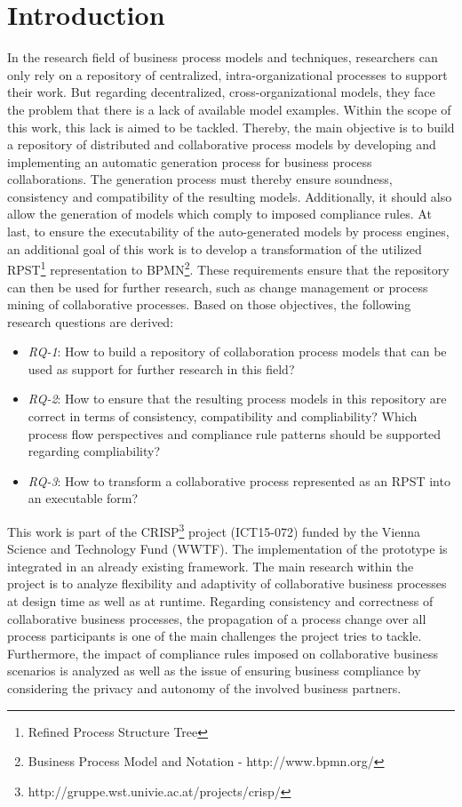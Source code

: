 \documentclass[runningheads]{llncs}
\begin{document}
\section{Introduction}
In the research field of business process models and techniques, researchers can only rely on a repository of centralized, intra-organizational processes to support their work. But regarding decentralized, cross-organizational models, they face the problem that there is a lack of available model examples. Within the scope of this work, this lack is aimed to be tackled. Thereby, the main objective is to build a repository of distributed and collaborative process models by developing and implementing an automatic generation process for business process collaborations. The generation process must thereby ensure soundness, consistency and compatibility of the resulting models. Additionally, it should also allow the generation of models which comply to imposed compliance rules. At last, to ensure the executability of the auto-generated models by process engines, an additional goal of this work is to develop a transformation of the utilized RPST\footnote{Refined Process Structure Tree } representation to BPMN\footnote{Business Process Model and Notation - http://www.bpmn.org/}. These requirements ensure that the repository can then be used for further research, such as change management or process mining of collaborative processes. Based on those objectives, the following research questions are derived:

\begin{itemize}
\item \textit{RQ-1}: How to build a repository of collaboration process models that can be used as support for further research in this field?
\item \textit{RQ-2}: How to ensure that the resulting process models in this repository are correct in terms of consistency, compatibility and compliability? Which process flow perspectives and compliance rule patterns should be supported regarding compliability? 
\item \textit{RQ-3}: How to transform a collaborative process represented as an RPST into an executable form?
\end{itemize}

This work is part of the CRISP\footnote{http://gruppe.wst.univie.ac.at/projects/crisp/} project (ICT15-072) funded by the Vienna Science and Technology Fund (WWTF). The implementation of the prototype is integrated in an already existing framework. The main research within the project is to analyze flexibility and adaptivity of collaborative business processes at design time as well as at runtime. Regarding consistency and correctness of collaborative business processes, the propagation of a process change over all process participants is one of the main challenges the project tries to tackle. Furthermore, the impact of compliance rules imposed on collaborative business scenarios is analyzed as well as the issue of ensuring business compliance by considering the privacy and autonomy of the involved business partners.\\
\end{document}
